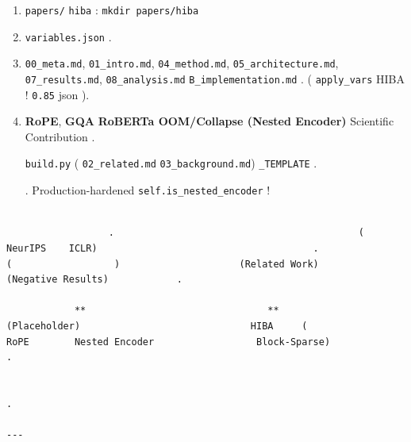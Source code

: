 \begin{enumerate}
\item \texttt{papers/}                 \texttt{hiba}     : \texttt{mkdir papers/hiba}
\item \texttt{variables.json}                         .
\item \texttt{00\_meta.md}, \texttt{01\_intro.md}, \texttt{04\_method.md}, \texttt{05\_architecture.md}, \texttt{07\_results.md}, \texttt{08\_analysis.md}   \texttt{B\_implementation.md}                                                 . (                              \texttt{apply\_vars}                                           HIBA                 !                                     \texttt{0.85}                                    json           ).
\item \textbf{RoPE}, \textbf{GQA}        \textbf{RoBERTa OOM/Collapse (Nested Encoder)}                                           Scientific Contribution                 .

  \texttt{build.py}                                          (    \texttt{02\_related.md}    \texttt{03\_background.md})            \texttt{\_TEMPLATE}                                                                             .

  .              Production-hardened                   \texttt{self.is\_nested\_encoder}            !

\end{enumerate}
\begin{lstlisting}

                  .                                           (    NeurIPS    ICLR)                                      .                         (                  )                     (Related Work)                                                         (Negative Results)            .

            **                                **                                                            (Placeholder)                              HIBA     (                       RoPE        Nested Encoder                  Block-Sparse)                     .

                                                                                         .

---
\end{lstlisting}
